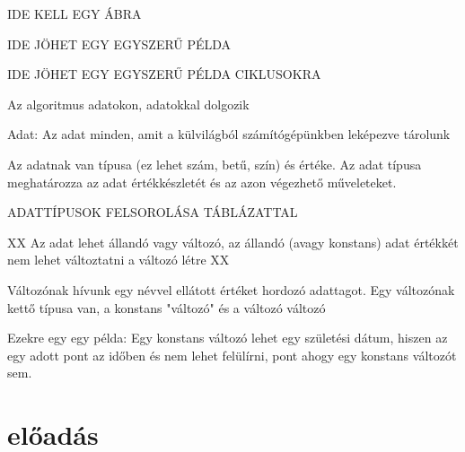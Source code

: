 \documentclass[12pt, a4paper]{article}
\begin{document}
 IDE KELL EGY ÁBRA 

 IDE JÖHET EGY EGYSZERŰ PÉLDA 

 IDE JÖHET EGY EGYSZERŰ PÉLDA CIKLUSOKRA 

Az algoritmus adatokon, adatokkal dolgozik

Adat: Az adat minden, amit a külvilágból számítógépünkben leképezve tárolunk

Az adatnak van típusa (ez lehet szám, betű, szín) és értéke. Az adat típusa meghatározza az adat értékkészletét és az azon végezhető műveleteket.

 ADATTÍPUSOK FELSOROLÁSA TÁBLÁZATTAL  

XX Az adat lehet állandó vagy változó, az állandó (avagy konstans) adat értékkét nem lehet változtatni a változó létre XX

Változónak hívunk egy névvel ellátott értéket hordozó adattagot. Egy változónak kettő típusa van, a konstans "változó" és a változó változó

Ezekre egy egy példa:
Egy konstans változó lehet egy születési dátum, hiszen az egy adott pont az időben és nem lehet felülírni, pont ahogy egy konstans változót sem.

\section{előadás}
\end{document}
